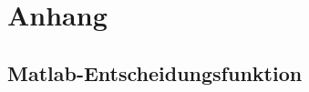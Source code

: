 \chapter{Anhang} \label{chap:Anhang}
\section{Matlab-Entscheidungsfunktion} \label{Anh:Entscheidungsfunktion}



